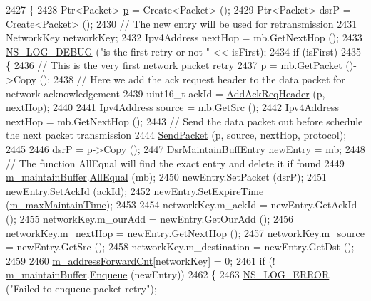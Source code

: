 \begin{DoxyCode}
2427 \{
2428   Ptr<Packet> \hyperlink{lte__link__budget_8m_ac9de518908a968428863f829398a4e62}{p} = Create<Packet> ();
2429   Ptr<Packet> dsrP = Create<Packet> ();
2430   \textcolor{comment}{// The new entry will be used for retransmission}
2431   NetworkKey networkKey;
2432   Ipv4Address nextHop = mb.GetNextHop ();
2433   \hyperlink{group__logging_ga413f1886406d49f59a6a0a89b77b4d0a}{NS\_LOG\_DEBUG} (\textcolor{stringliteral}{"is the first retry or not "} << isFirst);
2434   \textcolor{keywordflow}{if} (isFirst)
2435     \{
2436       \textcolor{comment}{// This is the very first network packet retry}
2437       p = mb.GetPacket ()->Copy ();
2438       \textcolor{comment}{// Here we add the ack request header to the data packet for network acknowledgement}
2439       uint16\_t ackId = \hyperlink{classns3_1_1dsr_1_1DsrRouting_a8ce910f1c56dc238ff98117c784c4541}{AddAckReqHeader} (p, nextHop);
2440 
2441       Ipv4Address source = mb.GetSrc ();
2442       Ipv4Address nextHop = mb.GetNextHop ();
2443       \textcolor{comment}{// Send the data packet out before schedule the next packet transmission}
2444       \hyperlink{classns3_1_1dsr_1_1DsrRouting_a84a2caf24a41eef8993b64cb22874f95}{SendPacket} (p, source, nextHop, protocol);
2445 
2446       dsrP = p->Copy ();
2447       DsrMaintainBuffEntry newEntry = mb;
2448       \textcolor{comment}{// The function AllEqual will find the exact entry and delete it if found}
2449       \hyperlink{classns3_1_1dsr_1_1DsrRouting_ac9d28a64437fbe20a4228c9811f9fc27}{m\_maintainBuffer}.\hyperlink{classns3_1_1dsr_1_1DsrMaintainBuffer_a2f553fb512d4aee9a538c799bc2d0f45}{AllEqual} (mb);
2450       newEntry.SetPacket (dsrP);
2451       newEntry.SetAckId (ackId);
2452       newEntry.SetExpireTime (\hyperlink{classns3_1_1dsr_1_1DsrRouting_ac6b1dffa9665af0d6a71aa7b947962ee}{m\_maxMaintainTime});
2453 
2454       networkKey.m\_ackId = newEntry.GetAckId ();
2455       networkKey.m\_ourAdd = newEntry.GetOurAdd ();
2456       networkKey.m\_nextHop = newEntry.GetNextHop ();
2457       networkKey.m\_source = newEntry.GetSrc ();
2458       networkKey.m\_destination = newEntry.GetDst ();
2459 
2460       \hyperlink{classns3_1_1dsr_1_1DsrRouting_a5042f7e5df0470025fdb6023fcc24411}{m\_addressForwardCnt}[networkKey] = 0;
2461       \textcolor{keywordflow}{if} (! \hyperlink{classns3_1_1dsr_1_1DsrRouting_ac9d28a64437fbe20a4228c9811f9fc27}{m\_maintainBuffer}.\hyperlink{classns3_1_1dsr_1_1DsrMaintainBuffer_a8ec30b5b9b0f6af36e61867327a47717}{Enqueue} (newEntry))
2462         \{
2463           \hyperlink{group__logging_ga0261a8db1d4ac5f79417d117634fd455}{NS\_LOG\_ERROR} (\textcolor{stringliteral}{"Failed to enqueue packet retry"});

\end{DoxyCode}
